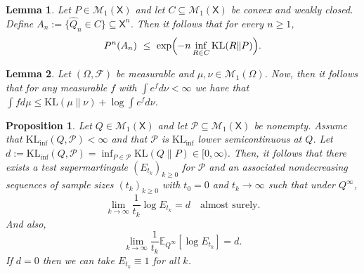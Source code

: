 \documentclass[10pt,a4paper]{amsart}
\newtheorem{lemma}{Lemma}
\newtheorem{proposition}{Proposition}
\newcommand{\E}{\mathbb{E}}
\newcommand{\KL}{\mathrm{KL}}
\newcommand{\KLinf}{\mathrm{KL}_{\mathrm{inf}}}
\newcommand{\Pcal}{\mathcal{P}}
\newcommand{\X}{\mathsf{X}}
\begin{document}
\begin{lemma}\label{lem:convex-empirical}
Let $P\in\mathcal M_1(\X)$ and let $C\subseteq\mathcal M_1(\X)$ be convex and weakly closed. Define $A_n:=\{\widehat Q_n\in C\}\subseteq \X^n$. Then it follows that for every $n\ge 1$,
\[
P^n(A_n)\ \le\ \exp\Bigl(-n\inf_{R\in C}\KL(R\|P)\Bigr).
\]
\end{lemma}

\begin{lemma}\label{lem:entropy-ineq}
Let $(\Omega, \mathcal F)$ be measurable and $\mu, \nu\in\mathcal M_1(\Omega)$. Now, then it follows that for any measurable $f$ with $\int e^{f}d\nu<\infty$ we have that $\int fd\mu \le \KL(\mu\|\nu)+\log\int e^{f}d\nu$.    
\end{lemma}

\begin{proposition}\label{prop:eprocess-rate}
Let $Q\in\mathcal M_1(\X)$ and let $\Pcal\subseteq\mathcal M_1(\X)$ be nonempty. Assume that $\KLinf(Q,\Pcal)<\infty$ and that $\Pcal$ is $\KLinf$ lower semicontinuous at $Q$. Let $d:=\KLinf(Q,\Pcal)=\inf_{P\in\Pcal}\KL(Q\|P)\in[0,\infty)$. Then, it follows that there exists a test supermartingale $(E_{t_k})_{k\ge 0}$ for $\Pcal$ and an associated nondecreasing sequences of sample sizes $(t_k)_{k\ge 0}$ with $t_0=0$ and $t_k\to\infty$ such that under $Q^\infty$,
\[
\lim_{k\to\infty}\frac{1}{t_k}\log E_{t_k} = d\quad{\text{almost surely.}}
\]
And also,
\[
\lim_{k\to\infty}\frac{1}{t_k}\E_{Q^\infty}[\log E_{t_k}]=d.
\]
If $d=0$ then we can take $E_{t_k}\equiv1$ for all $k$.
\end{proposition}
\end{document}
